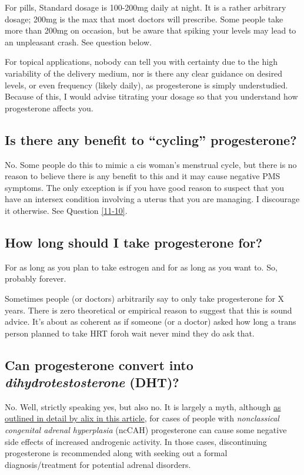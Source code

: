 \documentclass{article}
\begin{document}
For pills, Standard dosage is 100-200mg daily at night. It is a rather arbitrary dosage; 200mg is the max that most doctors will prescribe. Some people take more than 200mg on occasion, but be aware that spiking your levels may lead to an unpleasant crash. See question below.

For topical applications, nobody can tell you with certainty due to the high variability of the delivery medium, nor is there any clear guidance on desired levels, or even frequency (likely daily), as progesterone is simply understudied. Because of this, I would advise titrating your dosage so that you understand how progesterone affects you.

\subsection{Is there any benefit to “cycling” progesterone?}\label{8-11}

No. Some people do this to mimic a cis woman’s menstrual cycle, but there is no reason to believe there is any benefit to this and it may cause negative PMS symptoms. The only exception is if you have good reason to suspect that you have an intersex condition involving a uterus that you are managing. I discourage it otherwise. See Question \ref{11-10}.

\subsection{How long should I take progesterone for?}

For as long as you plan to take estrogen and for as long as you want to. So, probably forever.

Sometimes people (or doctors) arbitrarily say to only take progesterone for X years. There is zero theoretical or empirical reason to suggest that this is sound advice. It's about as coherent as if someone (or a doctor) asked how long a trans person planned to take HRT for\textemdash{}oh wait never mind they do ask that.

\subsection{Can progesterone convert into \textit{dihydrotestosterone} (DHT)?}

No. Well, strictly speaking yes, but also no. It is largely a myth, although \href{https://whsah.co/posts/rethinking-progesterone-and-androgens/}{as outlined in detail by alix in this article}, for cases of people with \textit{nonclassical congenital adrenal hyperplasia} (ncCAH) progesterone can cause some negative side effects of increased androgenic activity. In those cases, discontinuing progesterone is recommended along with seeking out a formal diagnosis/treatment for potential adrenal disorders.
\end{document}
